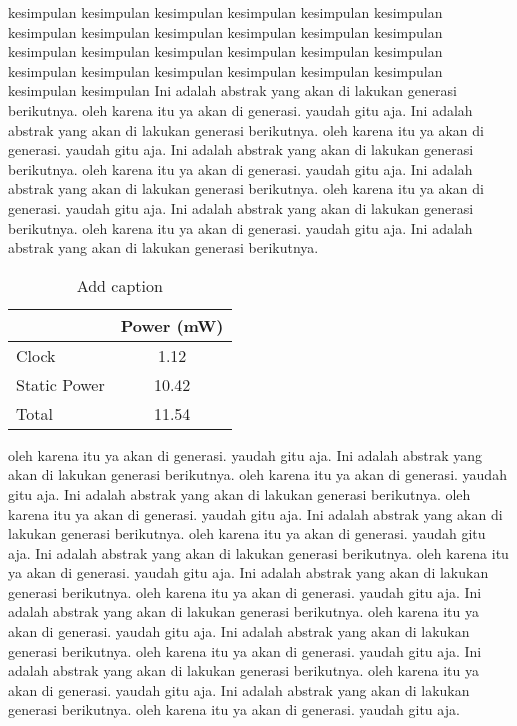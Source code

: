 kesimpulan kesimpulan kesimpulan kesimpulan kesimpulan kesimpulan kesimpulan kesimpulan kesimpulan kesimpulan kesimpulan kesimpulan kesimpulan kesimpulan kesimpulan kesimpulan kesimpulan kesimpulan kesimpulan kesimpulan kesimpulan kesimpulan kesimpulan kesimpulan kesimpulan kesimpulan Ini adalah abstrak yang akan di lakukan generasi berikutnya. oleh karena itu ya akan di generasi. yaudah gitu aja. Ini adalah abstrak yang akan di lakukan generasi berikutnya. oleh karena itu ya akan di generasi. yaudah gitu aja. Ini adalah abstrak yang akan di lakukan generasi berikutnya. oleh karena itu ya akan di generasi. yaudah gitu aja. Ini adalah abstrak yang akan di lakukan generasi berikutnya. oleh karena itu ya akan di generasi. yaudah gitu aja. Ini adalah abstrak yang akan di lakukan generasi berikutnya. oleh karena itu ya akan di generasi. yaudah gitu aja. Ini adalah abstrak yang akan di lakukan generasi berikutnya. 

\begin{table}[htbp]
	\centering
	\caption{Add caption}
	\begin{tabular}{|l|c|}
		\hline
		\rowcolor[rgb]{ .906,  .902,  .902} \multicolumn{1}{|c|}{Unprotected} & Power (mW) \bigstrut\\
		\hline
		Clock & 1.12 \bigstrut\\
		\hline
		Static Power & 10.42 \bigstrut\\
		\hline
		Total & 11.54 \bigstrut\\
		\hline
	\end{tabular}%
	\label{tab:addlabel}%
\end{table}%


oleh karena itu ya akan di generasi. yaudah gitu aja. Ini adalah abstrak yang akan di lakukan generasi berikutnya. oleh karena itu ya akan di generasi. yaudah gitu aja. Ini adalah abstrak yang akan di lakukan generasi berikutnya. oleh karena itu ya akan di generasi. yaudah gitu aja. Ini adalah abstrak yang akan di lakukan generasi berikutnya. oleh karena itu ya akan di generasi. yaudah gitu aja. Ini adalah abstrak yang akan di lakukan generasi berikutnya. oleh karena itu ya akan di generasi. yaudah gitu aja. Ini adalah abstrak yang akan di lakukan generasi berikutnya. oleh karena itu ya akan di generasi. yaudah gitu aja. Ini adalah abstrak yang akan di lakukan generasi berikutnya. oleh karena itu ya akan di generasi. yaudah gitu aja. Ini adalah abstrak yang akan di lakukan generasi berikutnya. oleh karena itu ya akan di generasi. yaudah gitu aja. Ini adalah abstrak yang akan di lakukan generasi berikutnya. oleh karena itu ya akan di generasi. yaudah gitu aja. Ini adalah abstrak yang akan di lakukan generasi berikutnya. oleh karena itu ya akan di generasi. yaudah gitu aja.

